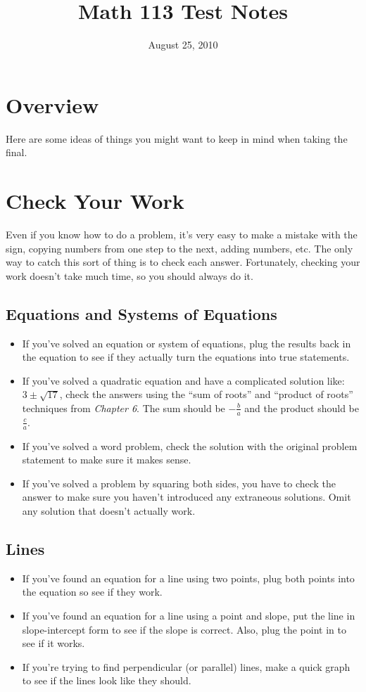 \documentclass{article}
\title{Math 113 Test Notes}
\date{August 25, 2010}
\begin{document}
\maketitle

\section{Overview}
Here are some ideas of things you might want to keep in mind when taking the final.

\section{Check Your Work}

Even if you know how to do a problem, it's very easy to make a mistake with the sign, copying numbers from one step to
the next, adding numbers, etc.  The only way to catch this sort of thing is to check each answer.  Fortunately, checking
your work doesn't take much time, so you should always do it.

\subsection{Equations and Systems of Equations}
\begin{itemize}
  \item If you've solved an equation or system of equations, plug the results back in the equation
    to see if they actually turn the equations into true statements.
  \item If you've solved a quadratic equation and have a complicated solution like: $3 \pm \sqrt{17}$, check the answers
    using the ``sum of roots'' and ``product of roots'' techniques from {\em Chapter 6}.  The sum should be
    $-\frac{b}{a}$ and the product should be $\frac{c}{a}$.
  \item If you've solved a word problem, check the solution with the original problem statement to make sure it makes
    sense.
  \item If you've solved a problem by squaring both sides, you have to check the answer to make sure you haven't
    introduced any extraneous solutions.  Omit any solution that doesn't actually work.
\end{itemize}

\subsection{Lines}
\begin{itemize}
  \item If you've found an equation for a line using two points, plug both points into the equation so see if they work.
  \item If you've found an equation for a line using a point and slope, put the line in slope-intercept form to see if
    the slope is correct.  Also, plug the point in to see if it works.
  \item If you're trying to find perpendicular (or parallel) lines, make a quick graph to see if the lines look like
    they should.
\end{itemize}
\end{document}
